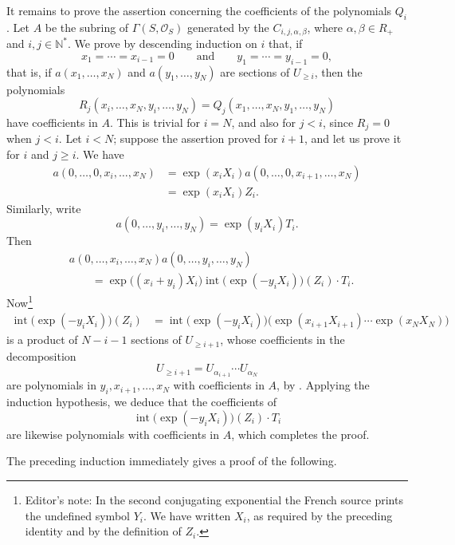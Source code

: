 It remains to prove the assertion concerning the coefficients of the
polynomials \(Q_i\). Let \(A\) be the subring of
\(\Gamma(S,\mathcal O_S)\) generated by the
\(C_{i,j,\alpha,\beta}\), where
\(\alpha,\beta\in R_+\) and \(i,j\in\mathbb N^*\).
We prove by descending induction on \(i\) that, if
\[
  x_1=\cdots=x_{i-1}=0
  \qquad\text{and}\qquad
  y_1=\cdots=y_{i-1}=0,
\]
that is, if \(a(x_1,\ldots,x_N)\) and \(a(y_1,\ldots,y_N)\)
are sections of \(U_{\geq i}\), then the polynomials
\[
  R_j(x_i,\ldots,x_N,y_i,\ldots,y_N)
  =
  Q_j(x_1,\ldots,x_N,y_1,\ldots,y_N)
\]
have coefficients in \(A\). This is trivial for \(i=N\), and
also for \(j<i\), since \(R_j=0\) when \(j<i\). Let \(i<N\);
suppose the assertion proved for \(i+1\), and let us prove it
for \(i\) and \(j\geq i\). We have
\[
\begin{split}
  a(0,\ldots,0,x_i,\ldots,x_N)
  &=
  \exp(x_iX_i)
  a(0,\ldots,0,x_{i+1},\ldots,x_N)\\
  &=
  \exp(x_iX_i)Z_i.
\end{split}
\]
Similarly, write
\[
  a(0,\ldots,y_i,\ldots,y_N)=\exp(y_iX_i)T_i.
\]
Then
\[
\begin{split}
  &a(0,\ldots,x_i,\ldots,x_N)
   a(0,\ldots,y_i,\ldots,y_N)\\
  &\qquad =
  \exp\bigl((x_i+y_i)X_i\bigr)
  \operatorname{int}\bigl(\exp(-y_iX_i)\bigr)(Z_i)\cdot T_i.
\end{split}
\]
Now\footnote{Editor's note: In the second conjugating exponential
the French source prints the undefined symbol \(Y_i\). We have
written \(X_i\), as required by the preceding identity and by the
definition of \(Z_i\).}
\[
\begin{split}
  \operatorname{int}\bigl(\exp(-y_iX_i)\bigr)(Z_i)
  &=
  \operatorname{int}\bigl(\exp(-y_iX_i)\bigr)
  \bigl(
    \exp(x_{i+1}X_{i+1})\cdots\exp(x_NX_N)
  \bigr)
\end{split}
\]
is a product of \(N-i-1\) sections of \(U_{\geq i+1}\), whose
coefficients in the decomposition
\[
  U_{\geq i+1}
  =
  U_{\alpha_{i+1}}\cdots U_{\alpha_N}
\]
are polynomials in \(y_i,x_{i+1},\ldots,x_N\) with coefficients
in \(A\), by . Applying the induction hypothesis, we deduce
that the coefficients of
\[
  \operatorname{int}\bigl(\exp(-y_iX_i)\bigr)(Z_i)\cdot T_i
\]
are likewise polynomials with coefficients in \(A\), which
completes the proof.

The preceding induction immediately gives a proof of the following.

